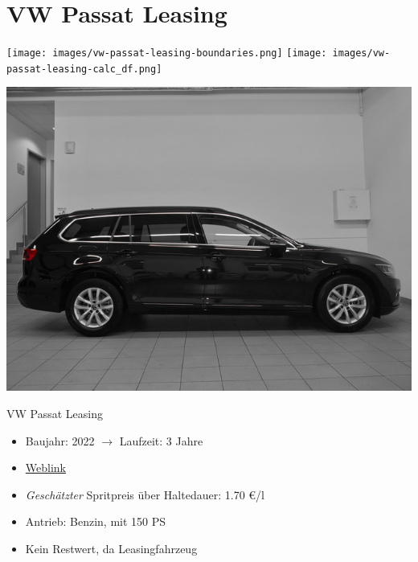 \documentclass[landscape, DIV=99, 14pt]{scrartcl}
\begin{document}
\twocolumn

\section*{VW Passat Leasing}
\begin{center}
\texttt{[image: images/vw-passat-leasing-boundaries.png]}
\null
\vspace{0.5cm}
\texttt{[image: images/vw-passat-leasing-calc\_df.png]}
\end{center}

\pagebreak
\null
\vspace{2cm}
\begin{center}
\includegraphics[width=0.9\columnwidth]{cars/vw-passat-leasing.jpg}

VW Passat Leasing
\end{center}

\begin{itemize}
    \item Baujahr: 2022 $\rightarrow$ Laufzeit: 3 Jahre
    \item \href{https://www.autosuche.de/auto/REVVNDQ3NjgwMjc5NzI=?t_manuf=BQ&t_petr=B&t_model=BQBM&t_gear=A&t_ez_fr=2020&t_pe_fr=35000&sort=PRICE_SALE&sortdirection=ASC&viewMode=tile}{Weblink}
    \item \emph{Gesch\"atzter} Spritpreis \"uber Haltedauer: 1.70 \euro{}/l
    \item Antrieb: Benzin, mit 150 PS
    \item Kein Restwert, da Leasingfahrzeug
\end{itemize}

\pagebreak


\twocolumn
\end{document}

